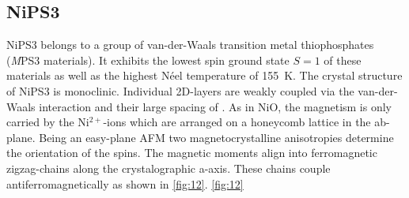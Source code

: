 \subsection{NiPS3}
NiPS3 belongs to a group of van-der-Waals transition metal thiophosphates (\textit{M}PS3 materials).
It exhibits the lowest spin ground state $S=1$ of these materials as well as the highest Néel temperature of \qty{155}{K}.
The crystal structure of NiPS3 is monoclinic.
Individual 2D-layers are weakly coupled via the van-der-Waals interaction and their large spacing of  \cite{afanasiev_controlling_2021}.
As in NiO, the magnetism is only carried by the Ni$^{2+}$-ions which are arranged on a honeycomb lattice in the ab-plane.
Being an easy-plane AFM two magnetocrystalline anisotropies determine the orientation of the spins.
The magnetic moments align into ferromagnetic zigzag-chains along the crystalographic a-axis.
These chains couple antiferromagnetically as shown in \autoref{fig:12}.
\autoref{fig:12}

